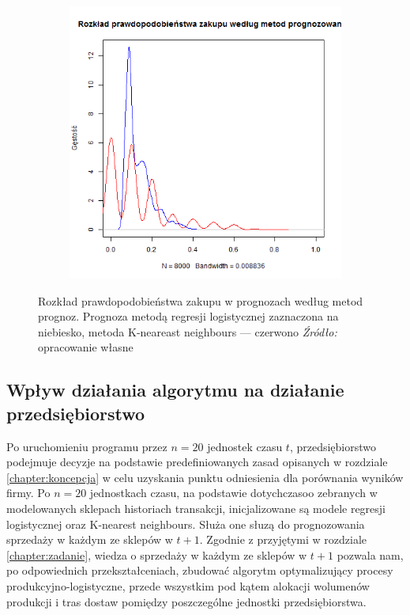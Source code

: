\documentclass[polish, twoside, 12pt, a4paper]{article}
\theoremstyle{definition}
\theoremstyle{plain}
\theoremstyle{remark}
\begin{document}
\begin{figure}[hbt]
  \centering

  \begin{subfigure}[t]{0.45\textwidth}
    \includegraphics[width=\textwidth]{pictures/rozklad_prognoz}
  \end{subfigure}
  \captionsetup{margin=10pt,font=small,labelfont=bf,width=.8\textwidth}

  \caption[Rozkład prawdopodobieństwa zakupu w prognozach]{Rozkład prawdopodobieństwa zakupu w prognozach według metod prognoz. Prognoza metodą regresji logistycznej zaznaczona na niebiesko, metoda K-neareast neighbours --- czerwono \textit{Źródło:} opracowanie własne}\label{fig:rozklad_lg_kn}
\end{figure}

\subsection{Wpływ działania algorytmu na działanie przedsiębiorstwo} \label{chapter:wyniki}

Po uruchomieniu programu przez $n=20$ jednostek czasu $t$, przedsiębiorstwo podejmuje decyzje na podstawie predefiniowanych zasad opisanych w rozdziale \ref{chapter:koncepcja} w celu uzyskania punktu odniesienia dla porównania wyników firmy. Po $n=20$ jednostkach czasu, na podstawie dotychczasoo zebranych w modelowanych sklepach historiach transakcji, inicjalizowane są modele regresji logistycznej oraz K-nearest neighbours. Służa one słuzą do prognozowania sprzedaży w każdym ze sklepów w $t+1$. Zgodnie z przyjętymi w rozdziale \ref{chapter:zadanie}, wiedza o sprzedaży w każdym ze sklepów w $t+1$ pozwala nam, po odpowiednich przekształceniach, zbudować algorytm optymalizujący procesy produkcyjno-logistyczne, przede wszystkim pod kątem alokacji wolumenów produkcji i tras dostaw pomiędzy poszczególne jednostki przedsiębiorstwa. 
\end{document}

